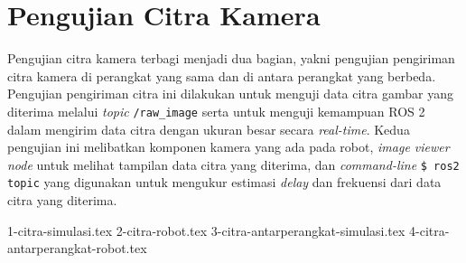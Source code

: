 \section{Pengujian Citra Kamera}
\label{sec:pengujiancitrakamera}

Pengujian citra kamera terbagi menjadi dua bagian,
  yakni pengujian pengiriman citra kamera di perangkat yang sama dan di antara perangkat yang berbeda.
Pengujian pengiriman citra ini dilakukan untuk menguji data citra gambar yang diterima melalui \emph{topic} \lstinline{/raw_image} serta untuk menguji kemampuan ROS 2 dalam mengirim data citra dengan ukuran besar secara \emph{real-time}.
Kedua pengujian ini melibatkan komponen kamera yang ada pada robot,
  \emph{image viewer node} untuk melihat tampilan data citra yang diterima,
  dan \emph{command-line} \lstinline{$ ros2 topic} yang digunakan untuk mengukur estimasi \emph{delay} dan frekuensi dari data citra yang diterima.

{1-citra-simulasi.tex}
{2-citra-robot.tex}
{3-citra-antarperangkat-simulasi.tex}
{4-citra-antarperangkat-robot.tex}
